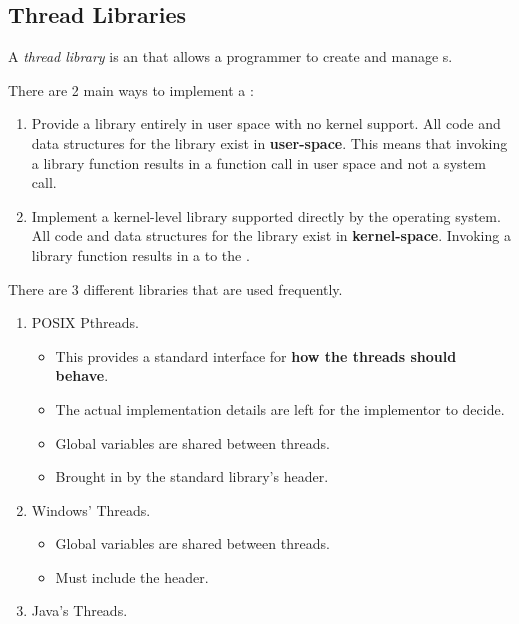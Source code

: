 \subsection{Thread Libraries}\label{subsec:Thread_Libraries}
\begin{definition}\label{def:Thread_Library}
  A \emph{thread library} is an  that allows a programmer to create and manage s.
\end{definition}

There are 2 main ways to implement a :
\begin{enumerate}[noitemsep]
\item Provide a library entirely in user space with no kernel support.
  All code and data structures for the library exist in \textbf{user-space}.
  This means that invoking a library function results in a function call in user space and not a system call.
\item Implement a kernel-level library supported directly by the operating system.
  All code and data structures for the library exist in \textbf{kernel-space}.
  Invoking a library function results in a  to the .
\end{enumerate}

There are 3 different libraries that are used frequently.
\begin{enumerate}[noitemsep]
\item POSIX Pthreads.
  \begin{itemize}[noitemsep]
  \item This provides a standard interface for \textbf{how the threads should behave}.
  \item The actual implementation details are left for the implementor to decide.
  \item Global variables are shared between threads.
  \item Brought in by the standard library's  header.
  \end{itemize}
\item Windows' Threads.
  \begin{itemize}[noitemsep]
  \item Global variables are shared between threads.
  \item Must include the  header.
  \end{itemize}
\item Java's Threads.
\end{enumerate}


